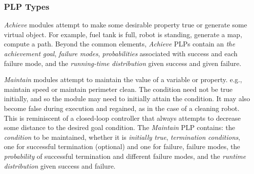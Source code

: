 \documentclass[letterpaper]{article}
\begin{document}
\subsubsection{PLP Types}


{\em Achieve\/} modules attempt to make some desirable property true or  generate some virtual object. For example,
fuel tank is full, robot is standing, generate a map, compute a path.
Beyond the common elements, {\em Achieve} PLPs contain an \textit{the achievement goal},
\textit{failure modes}, \textit{probabilities} associated with
success and each failure mode, and the \textit{running-time distribution} given success and given failure.


{\em Maintain\/} modules attempt to maintain the value of a variable or
property.
e.g., maintain speed or maintain perimeter clean. The condition need not be true initially,
and so the module may need to initially attain the condition. It may also become false during execution and regained, as in the case of a cleaning robot. This is reminiscent of a closed-loop controller that always attempts to decrease some distance to the desired goal condition.
%
The {\em Maintain} PLP contains: the \textit{condition} to be maintained,
whether it is \textit{initially true}, \textit{termination conditions}, one for successful termination (optional) and one for failure,
failure modes, the \textit{probability} of successful termination and different failure modes, and the \textit{runtime distribution} given success and failure.
\end{document}
